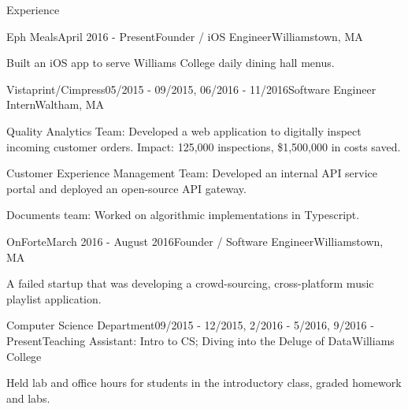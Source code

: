 \documentclass{resume} %
\begin{document}

\begin{rSection}{Experience}

\begin{rSubsection}{Eph Meals}{April 2016 - Present}{Founder / iOS Engineer}{Williamstown, MA}
  \item Built an iOS app to serve Williams College daily dining hall menus.
\end{rSubsection}


\begin{rSubsection}{Vistaprint/Cimpress}{05/2015 - 09/2015, 06/2016 - 11/2016}{Software Engineer Intern}{Waltham, MA}
  \item Quality Analytics Team: Developed a web application to digitally inspect incoming customer orders. Impact: 125,000 inspections, \$1,500,000 in costs saved.
  \item Customer Experience Management Team: Developed an internal API service portal and deployed an open-source API gateway.
  \item Documents team: Worked on algorithmic implementations in Typescript.
\end{rSubsection}


\begin{rSubsection}{OnForte}{March 2016 - August 2016}{Founder / Software Engineer}{Williamstown, MA}
  \item A failed startup that was developing a crowd-sourcing, cross-platform music playlist application.
\end{rSubsection}





\begin{rSubsection}{Computer Science Department}{09/2015 - 12/2015, 2/2016 - 5/2016, 9/2016 - Present}{Teaching Assistant: Intro to CS; Diving into the Deluge of Data}{Williams College}
  \item Held lab and office hours for students in the introductory class, graded homework and labs.

\end{rSubsection}
\end{rSection}
\end{document}
